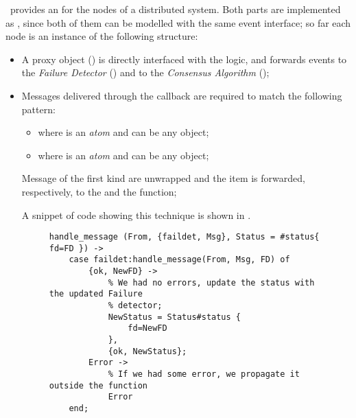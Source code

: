 \YUNA\ provides an  for the nodes of a
distributed system. Both parts are implemented as , since both of them can be modelled with the same event
interface; so far each node is an instance of the following structure:
\begin{itemize}

    \item   A proxy object () is directly interfaced
            with the  logic, and forwards
            events to the \emph{Failure Detector} () and
            to the \emph{Consensus Algorithm} ();

    \item   Messages delivered through the 
            callback are required to match the following pattern:

        \begin{itemize}

        \item   {} where  is an
                \emph{atom} and  can be any object;

        \item   {} where  is an
                \emph{atom} and  can be any object;

        \end{itemize}

            Message of the first kind are unwrapped and the 
            item is forwarded, respectively, to the
             and the
             function;

            A snippet of code showing this technique is shown in
            .

            \begin{figure}[tb!]
            \begin{lstlisting}[caption={Proxying for the failure detector},
                               label={code:Proxying}]
handle_message (From, {faildet, Msg}, Status = #status{ fd=FD }) ->
    case faildet:handle_message(From, Msg, FD) of
        {ok, NewFD} ->
            % We had no errors, update the status with the updated Failure
            % detector;
            NewStatus = Status#status {
                fd=NewFD
            },
            {ok, NewStatus};
        Error ->
            % If we had some error, we propagate it outside the function
            Error
    end;
            \end{lstlisting}
            \end{figure}


\end{itemize}
